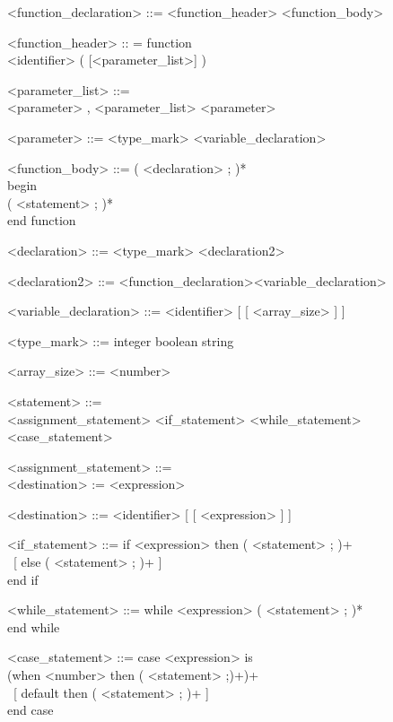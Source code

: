 \documentclass{article}
\newenvironment{grammar*}{\bfseries\begin{grammar}}{\end{grammar}\rmfamily}
\begin{document}
\begin{grammar*}
  <function_declaration> ::= <function_header> <function_body>

  <function_header> :: = 
  function\\
  <identifier>  ( [<parameter_list>] )

  <parameter_list> ::=\\ 
  <parameter> , <parameter_list>
  \alt <parameter>

  <parameter> ::= <type_mark> <variable_declaration>

  <function_body> ::= 
  ( <declaration>  ; )*\\
  begin\\
  ( <statement> ; )*\\
  end function


  <declaration> ::=
  <type_mark> <declaration2>

  <declaration2> ::=
  <function_declaration>\alt <variable_declaration>

  <variable_declaration> ::= <identifier> [ [ <array_size> ] ]

  <type_mark> ::=
  integer
  \alt boolean
  \alt string

  <array_size> ::= <number>

  <statement> ::=\\
  <assignment_statement>
  \alt <if_statement>
  \alt <while_statement>
  \alt <case_statement>


  <assignment_statement> ::=\\
  <destination> := <expression>
  
  <destination> ::= 
  <identifier> [ [ <expression> ] ]

  <if_statement> ::=
  if <expression> then ( <statement> ; )+\\\ 
  [ else ( <statement> ; )+ ]\\
  end if

  <while_statement> ::=
  while <expression> ( <statement> ; )*\\
  end while

  <case_statement> ::=
  case <expression> is\\
  (when <number> then ( <statement> ;)+)+\\\ 
  [ default then ( <statement> ; )+ ]\\
  end case


\end{grammar*}
\end{document}
